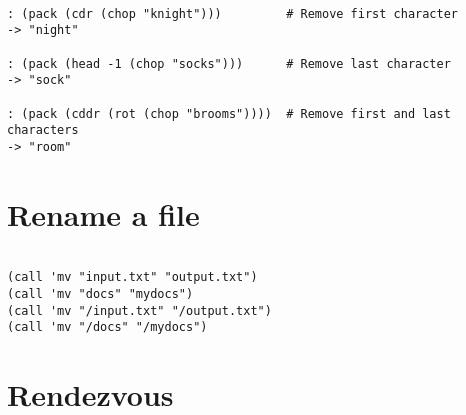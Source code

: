 \begin{verbatim}

: (pack (cdr (chop "knight")))         # Remove first character
-> "night"

: (pack (head -1 (chop "socks")))      # Remove last character
-> "sock"

: (pack (cddr (rot (chop "brooms"))))  # Remove first and last characters
-> "room"

\end{verbatim}

\section*{Rename a file}

\begin{verbatim}

(call 'mv "input.txt" "output.txt")
(call 'mv "docs" "mydocs")
(call 'mv "/input.txt" "/output.txt")
(call 'mv "/docs" "/mydocs")

\end{verbatim}

\section*{Rendezvous}

